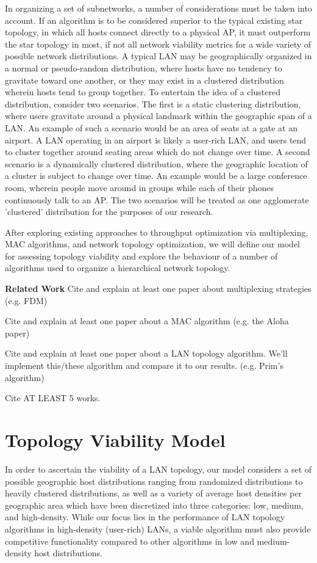 \documentclass{sigcomm-alternate}
\begin{document}
In organizing a set of subnetworks, a number of considerations must be taken into account. If an algorithm is to be considered superior to the typical existing star topology, in which all hosts connect directly to a physical AP, it must outperform the star topology in most, if not all network viability metrics for a wide variety of possible network distributions. A typical LAN may be geographically organized in a normal or pseudo-random distribution, where hosts have no tendency to gravitate toward one another, or they may exist in a clustered distribution wherein hosts tend to group together. To entertain the idea of a clustered distribution, consider two scenarios. The first is a static clustering distribution, where users gravitate around a physical landmark within the geographic span of a LAN. An example of such a scenario would be an area of seats at a gate at an airport. A LAN operating in an airport is likely a user-rich LAN, and users tend to cluster together around seating areas which do not change over time. A second scenario is a dynamically clustered distribution, where the geographic location of a cluster is subject to change over time. An example would be a large conference room, wherein people move around in groups while each of their phones continuously talk to an AP. The two scenarios will be treated as one agglomerate 'clustered' distribution for the purposes of our research.

After exploring existing approaches to throughput optimization via multiplexing, MAC algorithms, and network topology optimization, we will define our model for assessing topology viability and explore the behaviour of a number of algorithms used to organize a hierarchical network topology.

\textbf{Related Work}
Cite and explain at least one paper about multiplexing strategies (e.g. FDM)

Cite and explain at least one paper about a MAC algorithm (e.g. the Aloha paper)

Cite and explain at least one paper about a LAN topology algorithm. We'll implement this/these algorithm and compare it to our results. (e.g. Prim's algorithm)

Cite AT LEAST 5 works.



\section{Topology Viability Model}
In order to ascertain the viability of a LAN topology, our model considers a set of possible geographic host distributions ranging from randomized distributions to heavily clustered distributions, as well as a variety of average host densities per geographic area which have been discretized into three categories: low, medium, and high-density. While our focus lies in the performance of LAN topology algorithms in high-density (user-rich) LANs, a viable algorithm must also provide competitive functionality compared to other algorithms in low and medium-density host distributions.
\end{document}
